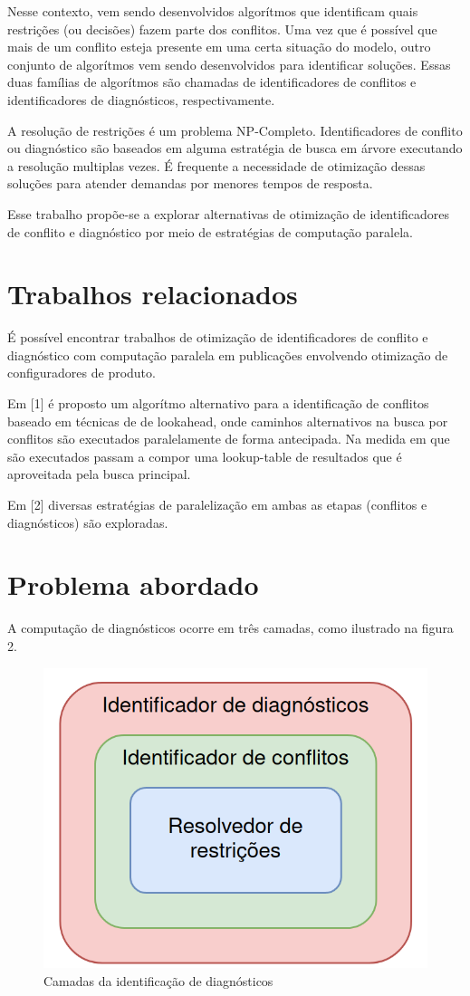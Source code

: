 \documentclass[conference]{IEEEtran}
\begin{document}
Nesse contexto, vem sendo desenvolvidos algorítmos que identificam quais restrições (ou decisões) fazem parte dos conflitos. Uma vez que é possível que mais de um conflito esteja presente em uma certa situação do modelo, outro conjunto de algorítmos vem sendo desenvolvidos para identificar soluções. Essas duas famílias de algorítmos são chamadas de identificadores de conflitos e identificadores de diagnósticos, respectivamente.

A resolução de restrições é um problema NP-Completo. Identificadores de conflito ou diagnóstico são baseados em alguma estratégia de busca em árvore executando a resolução multiplas vezes. É frequente a necessidade de otimização dessas soluções para atender demandas por menores tempos de resposta.

Esse trabalho propõe-se a explorar alternativas de otimização de identificadores de conflito e diagnóstico por meio de estratégias de computação paralela. 

\section{Trabalhos relacionados}

É possível encontrar trabalhos de otimização de identificadores de conflito e diagnóstico com computação paralela em publicações envolvendo otimização de configuradores de produto. 

Em [1] é proposto um algorítmo alternativo para a identificação de conflitos baseado em técnicas de de lookahead, onde caminhos alternativos na busca por conflitos são executados paralelamente de forma antecipada. Na medida em que são executados passam a compor uma lookup-table de resultados que é aproveitada pela busca principal.

Em [2] diversas estratégias de paralelização em ambas as etapas (conflitos e diagnósticos) são exploradas. 

\section{Problema abordado}

A computação de diagnósticos ocorre em três camadas, como ilustrado na figura 2.


\begin{figure}[htbp]
\centerline{\includegraphics[width=0.7\columnwidth]{layers.png}}
\caption{Camadas da identificação de diagnósticos} 
\label{fig}
\end{figure}
\end{document}
